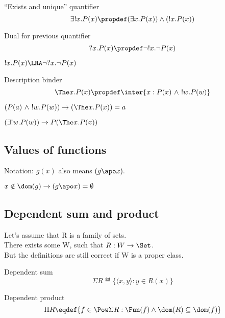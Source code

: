 \documentclass[10pt,a4paper]{article}
\begin{document}
\begin{definition} ``Exists and unique'' quantifier
$$\exists !x. P(x) \propdef (\exists x. P(x))\land(!x. P(x))$$
\end{definition}

\begin{definition}  Dual for previous quantifier 
$$?x. P(x) \propdef \neg !x. \neg P(x)$$
\end{definition}

\begin{exercise}
$!x. P(x) \LRA \neg ?x. \neg P(x)$
\end{exercise}

\begin{definition} Description binder
$$\The x. P(x) \propdef \inter \{x:P(x)\ \land\ !w.P(w)\}$$
\end{definition}

\begin{exercise}
$(P(a)\ \land\ !w.P(w)) \rightarrow (\The x. P(x))=a$
\end{exercise}

\begin{exercise}
$(\exists !w.P(w)) \rightarrow P(\The x. P(x))$
\end{exercise}

\subsection{Values of functions}
Notation: $g(x)$ also means $(g\apo x).$\\

\begin{exercise}
$x\notin \dom(g)\to (g\apo x)=\emptyset$
\end{exercise}

\subsection{Dependent sum and product}
Let's assume that R is a family of sets.\\
There exists some W, such that $R:W\to\Set$.\\
But the definitions are still correct if W is a proper class.\\
\begin{definition} Dependent sum
$$\Sigma R\eqdef\{\langle x, y\rangle: y\in R(x)\}$$
\end{definition}
\begin{definition} Dependent product
$$\Pi R\eqdef\{ f\in \Pow\Sigma R: \Fun(f)\land \dom(R)\subseteq \dom(f)\}$$
\end{definition}
\end{document}
